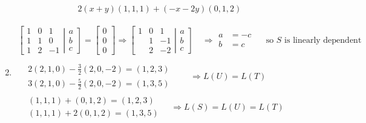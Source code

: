 \documentclass[twoside]{amsart}
\theoremstyle{plain}
\theoremstyle{definition}
\begin{document}
\begin{enumerate}
\[\begin{gathered}
  \boxed{ 2(x+y)(1,1,1) + (-x-2y)(0,1,2) }
\end{gathered}
\]
\item 
\[
\begin{gathered}
  \left[ \begin{matrix} 
      1 & 0 & 1 \\
      1 & 1 & 0 \\
      1 & 2 & -1 \end{matrix} \right. \left| \begin{matrix} a \\ b \\ c \end{matrix} \right] = \left[ \begin{matrix} 0 \\ 0 \\ 0 \end{matrix} \right] \Longrightarrow \left[ \begin{matrix} 1 & 0 & 1 \\
      & 1 & -1 \\
      & 2 & -2 \end{matrix} \right. \left| \begin{matrix} a \\ b \\ c \end{matrix} \right] \quad \Longrightarrow 
  \begin{aligned}
     a & = -c \\
     b & = c 
\end{aligned} \quad \text{ so $S$ is linearly dependent }  \\
\quad \\
\begin{aligned}
  & 2(2,1,0) - \frac{3}{2} (2,0,-2) = (1,2,3) \\
  & 3(2,1,0) - \frac{5}{2} (2,0,-2) = (1,3,5) 
\end{aligned} \quad \quad \Longrightarrow L(U) = L(T)  \\
\begin{aligned}
  & (1,1,1) + (0,1,2) = (1,2,3) \\
  &  (1,1,1) + 2(0,1,2) = (1,3,5) 
\end{aligned} \quad \Longrightarrow L(S) = L(U) = L(T) 
\end{gathered}
\] 
\end{enumerate}
\end{document}
